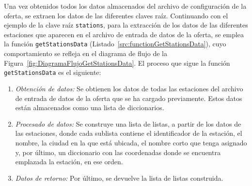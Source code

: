 
Una vez obtenidos todos los datos almacenados del archivo de configuración de la oferta, se extraen los datos de las diferentes claves raíz. Continuando con el ejemplo de la clave raíz \texttt{stations}, para la extracción de los datos de las diferentes estaciones que aparecen en el archivo de entrada de datos de la oferta, se emplea la función \texttt{getStationsData} (Listado~\ref{src:functionGetStationsData}), cuyo comportamiento se refleja en el diagrama de flujo de la Figura~\ref{fig:DiagramaFlujoGetStationsData}. El proceso que sigue la función \texttt{getStationsData} es el siguiente:
\begin{enumerate}
    \item \textit{Obtención de datos:} Se obtienen los datos de todas las estaciones del archivo de entrada de datos de la oferta que se ha cargado previamente. Estos datos están almacenados como una lista de diccionarios.
    \item \textit{Procesado de datos:} Se construye una lista de listas, a partir de los datos de las estaciones, donde cada sublista contiene el identificador de la estación, el nombre, la ciudad en la que está ubicada, el nombre corto que tenga asignado y, por último, un diccionario con las coordenadas donde se encuentra emplazada la estación, en ese orden. 
    \item \textit{Datos de retorno:} Por último, se devuelve la lista de listas construida.
\end{enumerate}

